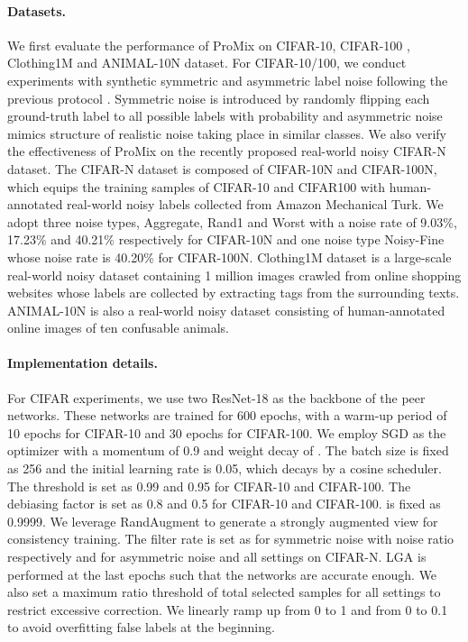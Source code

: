 \documentclass{article}
\begin{document}
\paragraph{Datasets.}
We first evaluate the performance of ProMix on CIFAR-10, CIFAR-100 \cite{krizhevsky2009learning}, Clothing1M \cite{DBLP:conf/cvpr/XiaoXYHW15} and ANIMAL-10N \cite{DBLP:conf/icml/SongK019} dataset. For CIFAR-10/100, we conduct experiments with synthetic symmetric and asymmetric label noise following the previous protocol \cite{DBLP:conf/cvpr/TanakaIYA18}. Symmetric noise is introduced by randomly flipping each ground-truth label to all possible labels with probability  and asymmetric noise mimics structure of realistic noise taking place in similar classes. We also verify the effectiveness of ProMix on the recently proposed real-world noisy CIFAR-N \cite{DBLP:conf/iclr/WeiZ0L0022} dataset. The CIFAR-N dataset is composed of CIFAR-10N and CIFAR-100N, which equips the training samples of CIFAR-10 and CIFAR100 with human-annotated real-world noisy labels collected from Amazon Mechanical Turk. We adopt three noise types, Aggregate, Rand1 and Worst with a noise rate of 9.03\%, 17.23\% and 40.21\% respectively for CIFAR-10N and one noise type Noisy-Fine whose noise rate is 40.20\% for CIFAR-100N. Clothing1M dataset is a large-scale real-world noisy dataset containing 1 million images crawled from online shopping websites whose labels are collected by extracting tags from the surrounding texts. ANIMAL-10N is also a real-world noisy dataset consisting of human-annotated online images of ten confusable animals.







\paragraph{Implementation details.}
For CIFAR experiments, we use two ResNet-18 as the backbone of the peer networks. These networks are trained for 600 epochs, with a warm-up period of 10 epochs for CIFAR-10 and 30 epochs for CIFAR-100. We employ SGD as the optimizer with a momentum of 0.9 and weight decay of . The batch size is fixed as 256 and the initial learning rate is 0.05, which decays by a cosine scheduler. The threshold  is set as 0.99 and 0.95 for CIFAR-10 and CIFAR-100. The debiasing factor  is set as 0.8 and 0.5 for CIFAR-10 and CIFAR-100.  is fixed as 0.9999. We leverage RandAugment to generate a strongly augmented view for consistency training.  The filter rate  is set as  for symmetric noise with noise ratio  respectively and  for asymmetric noise and all settings on CIFAR-N. LGA is performed at the last  epochs such that the networks are accurate enough. We also set a maximum ratio threshold of total selected samples  for all settings to restrict excessive correction. We linearly ramp up  from 0 to 1 and  from 0 to 0.1 to avoid overfitting false labels at the beginning. 
\end{document}
